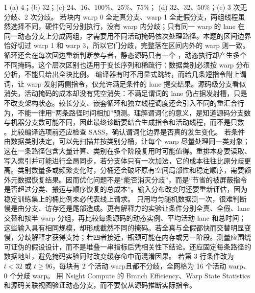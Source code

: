 \begin{solutionexercise}{1}
\conclusionheading (a) 4；(b) 32；(c) 24、16、$100\%$、$25\%$、$75\%$；
(d) 32、32、$50\%$；(e) 3 次无分歧、2 次分歧。
\discussionheading
{}
若块内 warp 0 全走真分支、warp 1 全走假分支，两组线程虽然选择不同，硬件仍可分别执行，没有 warp 内分歧；只有同一 warp 的 lane 在同一动态分支上分成两组，才需要用不同活动掩码依次处理路径。本题的区间边界恰好切过 warp 1 和 warp 3，所以它们分歧，完整落在区间内外的 warp 则一致。循环还会在每次回边重新判断参与者，静态源码只有一个 ，动态执行却产生多个不同掩码。这个层次区别也适用于变长序列和稀疏行：数据类别必须按 warp 分布分析，不能只给出全块比例。
编译器有时不用显式跳转，而给几条短指令附上谓词，让 warp 发射两侧指令，仅允许满足条件的 lane 提交结果。源码级分支看似消失，活动掩码的成本却没有凭空消失：不满足谓词的 lane 仍占据发射槽，只是不改变架构状态。较长分支、嵌套循环和独立线程调度还会引入不同的重汇合行为，不能一律用“两条路径时间相加”预测。理解谓词化的意义，是知道源码分支数与机器分支数可能不同，因此最终诊断要结合生成指令和活动线程，而不是只数 。比较编译选项前还应检查 SASS，确认谓词化边界是否真的发生变化。
若条件由数据类别决定，可以先扫描并按类别分桶，让每个 warp 尽量处理同一类对象；这在一条路径包含大量计算、类别在多个阶段复用时可能值得。重排本身要读取、写入索引并可能进行全局同步，若分支体只有一次加法，它的成本往往比原分歧更高。类别数量多或频繁变化时，分桶还会破坏原有空间局部性和稳定顺序，需要额外元数据恢复结果。因而优化问题不是“能否消灭分歧”，而是“节省的被屏蔽指令是否超过分类、搬运与顺序恢复的总成本”。输入分布改变时还要重新评估，因为稳定训练集上的桶比例未必代表线上请求。
只用均匀随机数据测一次，很难判断慢是由分支、访存还是尾部造成。更有解释力的实验让条件分别全真、全假、lane 交替和按半 warp 分组，再比较每条源码的动态实例、平均活动 lane 和总时间；这些输入具有相同规模，却形成截然不同的掩码。若全真与全假都快而交替明显变慢，分歧解释才获得支持；若四者接近，瓶颈可能在内存或另一阶段。测量应围绕可证伪的假设设计，而不是堆叠一串指标后凭相关性下结论。还应固定每条路径的数据地址，避免掩码实验同时改变缓存命中而混淆因果。
\variantheading 若第 3 行条件改为 $t<32$ 或 $t\ge96$，每块有 2 个活动 warp且都不分歧，全网格为 16 个活动 warp、0 个分歧 warp。
\practiceheading 用 Nsight Compute 的 Branch Efficiency、Warp State Statistics 和源码关联视图验证动态分支，而不要仅从源码推断实际指令。
\end{solutionexercise}

